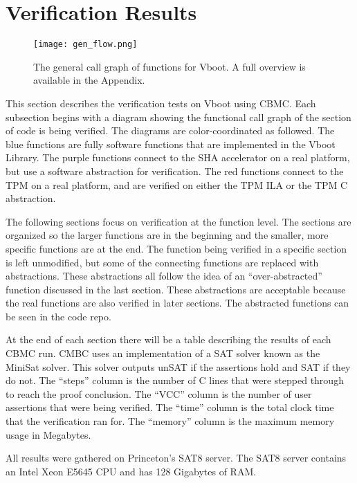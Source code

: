 \chapter{Verification Results}\label{sec:VerifResults}

 \begin{figure}[!htbp]
   \centering
   \texttt{[image: gen\_flow.png]}
   \caption[Vboot General Call Graph]{The general call graph of functions for Vboot. A full overview is available in the Appendix.}\label{fig:allflow}
 \end{figure}

This section describes the verification tests on Vboot using CBMC\@.
Each subsection begins with a diagram showing the functional call graph of the section of code is being verified.
The diagrams are color-coordinated as followed.
The blue functions are fully software functions that are implemented in the Vboot Library.
The purple functions connect to the SHA accelerator on a real platform, 
but use a software abstraction for verification.
The red functions connect to the TPM on a real platform, and are 
verified on either the TPM ILA or the TPM C abstraction.

The following sections focus on verification at the function level.
The sections are organized so the larger functions are in the beginning and the smaller, more specific functions are at the end. 
The function being verified in a specific section is left unmodified, but some of the connecting functions are replaced with abstractions.
These abstractions all follow the idea of an ``over-abstracted'' function discussed in the last section.
These abstractions are acceptable because the real functions are also verified in later sections.
The abstracted functions can be seen in the code repo\cite{my-repo}.

At the end of each section there will be a table describing the results of each CBMC run.
CMBC uses an implementation of a SAT solver known as the MiniSat solver\cite{minisat}.
This solver outputs unSAT if the assertions hold and SAT if they do not. 
The ``steps'' column is the number of C lines that were stepped through to reach the proof conclusion.
The ``VCC'' column is the number of user assertions that were being verified.
The ``time'' column is the total clock time that the verification ran for.
The ``memory'' column is the maximum memory usage in Megabytes.

All results were gathered on Princeton's SAT8 server. 
The SAT8 server contains an Intel Xeon E5645 CPU and has 128 Gigabytes of RAM.

